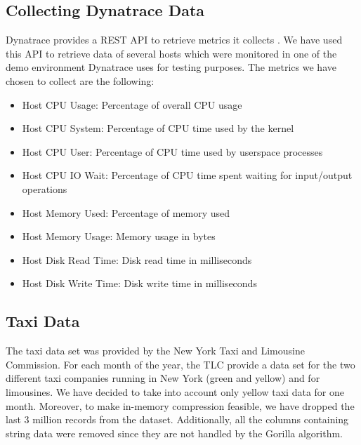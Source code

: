 \subsection{Collecting Dynatrace Data}
Dynatrace provides a REST API to retrieve metrics it collects \cite{a2013_metrics}.
We have used this API to retrieve data of several hosts which were monitored in one of the demo environment
Dynatrace uses for testing purposes.
The metrics we have chosen to collect are the following:
\begin{itemize}
    \item Host CPU Usage: Percentage of overall CPU usage
    \item Host CPU System: Percentage of CPU time used by the kernel
    \item Host CPU User: Percentage of CPU time used by userspace processes
    \item Host CPU IO Wait: Percentage of CPU time spent waiting for input/output operations
    \item Host Memory Used: Percentage of memory used
    \item Host Memory Usage: Memory usage in bytes
    \item Host Disk Read Time: Disk read time in milliseconds
    \item Host Disk Write Time: Disk write time in milliseconds
\end{itemize}

\subsection{Taxi Data}
The taxi data set was provided by the New York Taxi and Limousine Commission. For each month of the year,
the TLC provide a data set for the two different taxi companies running in New York (green and yellow)
and for limousines. We have decided to take into account only yellow taxi data for one month.
Moreover, to make in-memory compression feasible, we have dropped the last 3 million records from the
dataset. Additionally, all the columns containing string data were removed since they are not handled
by the Gorilla algorithm.

